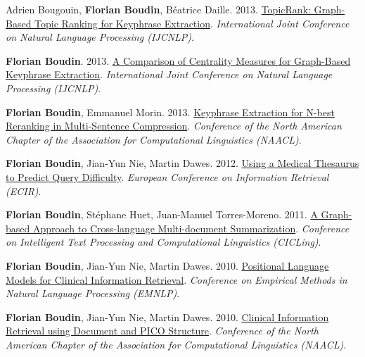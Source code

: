 \item
Adrien Bougouin, \textbf{Florian Boudin}, Béatrice Daille.
2013.
\href{https://aclanthology.org/I13-1062.pdf}{TopicRank: Graph-Based Topic Ranking for Keyphrase Extraction}.
\textit{International Joint Conference on Natural Language Processing (IJCNLP)}.
\label{bougouin-etal-2013-topicrank}

\item 
\textbf{Florian Boudin}.
2013.
\href{https://aclanthology.org/I13-1102.pdf}{A Comparison of Centrality Measures for Graph-Based Keyphrase Extraction}.
\textit{International Joint Conference on Natural Language Processing (IJCNLP)}.
\label{boudin-2013-comparison}

\item
\textbf{Florian Boudin}, Emmanuel Morin.
2013.
\href{https://aclanthology.org/N13-1030.pdf}{Keyphrase Extraction for N-best Reranking in Multi-Sentence Compression}.
\textit{Conference of the North American Chapter of the Association for Computational Linguistics (NAACL)}.
\label{boudin-morin-2013-keyphrase}

\item 
\textbf{Florian Boudin}, Jian-Yun Nie, Martin Dawes.
2012.
\href{https://link.springer.com/chapter/10.1007/978-3-642-28997-2_46}{Using a Medical Thesaurus to Predict Query Difficulty}.
\textit{European Conference on Information Retrieval (ECIR)}.
\label{boudin-etal-2012-medical}

\item 
\textbf{Florian Boudin}, Stéphane Huet, Juan-Manuel Torres-Moreno.
2011.
\href{http://polibits.gelbukh.com/2011_43/43_16.pdf}{A Graph-based Approach to Cross-language Multi-document Summarization}.
\textit{Conference on Intelligent Text Processing and Computational Linguistics (CICLing)}.
\label{boudin-etal-2011-graph}

\item 
\textbf{Florian Boudin}, Jian-Yun Nie, Martin Dawes.
2010.
\href{https://aclanthology.org/D10-1011.pdf}{Positional Language Models for Clinical Information Retrieval}.
\textit{Conference on Empirical Methods in Natural Language Processing (EMNLP)}.
\label{boudin-etal-2010-positional}

\item 
\textbf{Florian Boudin}, Jian-Yun Nie, Martin Dawes.
2010.
\href{https://aclanthology.org/N10-1124.pdf}{Clinical Information Retrieval using Document and PICO Structure}.
\textit{Conference of the North American Chapter of the Association for Computational Linguistics (NAACL)}.
\label{boudin-etal-2010-clinical}

